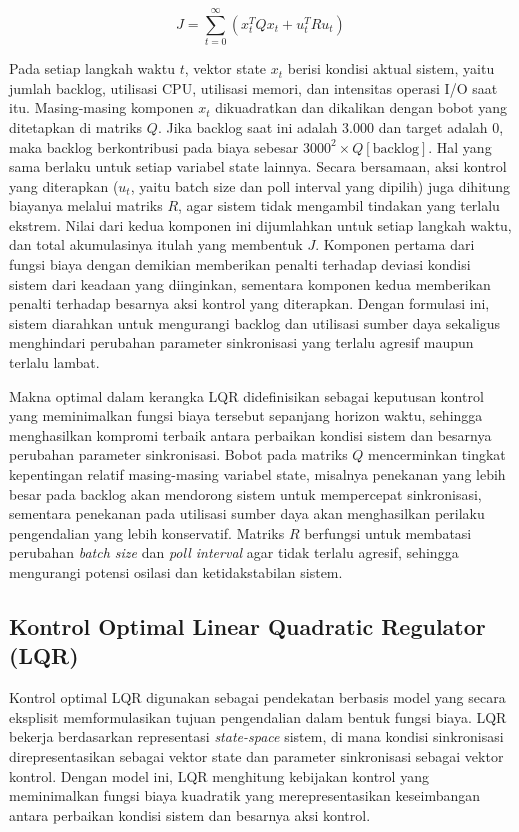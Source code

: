 \begin{equation}
J = \sum_{t=0}^{\infty} \left( x_t^T Q x_t + u_t^T R u_t \right)
\label{eq:fungsi-biaya}
\end{equation}

Pada setiap langkah waktu $t$, vektor state $x_t$ berisi kondisi aktual sistem, yaitu jumlah backlog, utilisasi CPU, utilisasi memori, dan intensitas operasi I/O saat itu.
Masing-masing komponen $x_t$ dikuadratkan dan dikalikan dengan bobot yang ditetapkan di matriks $Q$.
Jika backlog saat ini adalah 3.000 dan target adalah 0, maka backlog berkontribusi pada biaya sebesar $3000^2 \times Q[\text{backlog}]$.
Hal yang sama berlaku untuk setiap variabel state lainnya.
Secara bersamaan, aksi kontrol yang diterapkan ($u_t$, yaitu batch size dan poll interval yang dipilih) juga dihitung biayanya melalui matriks $R$, agar sistem tidak mengambil tindakan yang terlalu ekstrem.
Nilai dari kedua komponen ini dijumlahkan untuk setiap langkah waktu, dan total akumulasinya itulah yang membentuk $J$.
Komponen pertama dari fungsi biaya dengan demikian memberikan penalti terhadap deviasi kondisi sistem dari keadaan yang diinginkan, sementara komponen kedua memberikan penalti terhadap besarnya aksi kontrol yang diterapkan.
Dengan formulasi ini, sistem diarahkan untuk mengurangi backlog dan utilisasi sumber daya sekaligus menghindari perubahan parameter sinkronisasi yang terlalu agresif maupun terlalu lambat.

Makna optimal dalam kerangka LQR didefinisikan sebagai keputusan kontrol yang meminimalkan fungsi biaya tersebut sepanjang horizon waktu, sehingga menghasilkan kompromi terbaik antara perbaikan kondisi sistem dan besarnya perubahan parameter sinkronisasi.
Bobot pada matriks $Q$ mencerminkan tingkat kepentingan relatif masing-masing variabel state, misalnya penekanan yang lebih besar pada backlog akan mendorong sistem untuk mempercepat sinkronisasi, sementara penekanan pada utilisasi sumber daya akan menghasilkan perilaku pengendalian yang lebih konservatif.
Matriks $R$ berfungsi untuk membatasi perubahan \emph{batch size} dan \emph{poll interval} agar tidak terlalu agresif, sehingga mengurangi potensi osilasi dan ketidakstabilan sistem.

\subsection{Kontrol Optimal Linear Quadratic Regulator (LQR)}

Kontrol optimal LQR digunakan sebagai pendekatan berbasis model yang secara eksplisit memformulasikan tujuan pengendalian dalam bentuk fungsi biaya.
LQR bekerja berdasarkan representasi \emph{state-space} sistem, di mana kondisi sinkronisasi direpresentasikan sebagai vektor state dan parameter sinkronisasi sebagai vektor kontrol.
Dengan model ini, LQR menghitung kebijakan kontrol yang meminimalkan fungsi biaya kuadratik yang merepresentasikan keseimbangan antara perbaikan kondisi sistem dan besarnya aksi kontrol.

